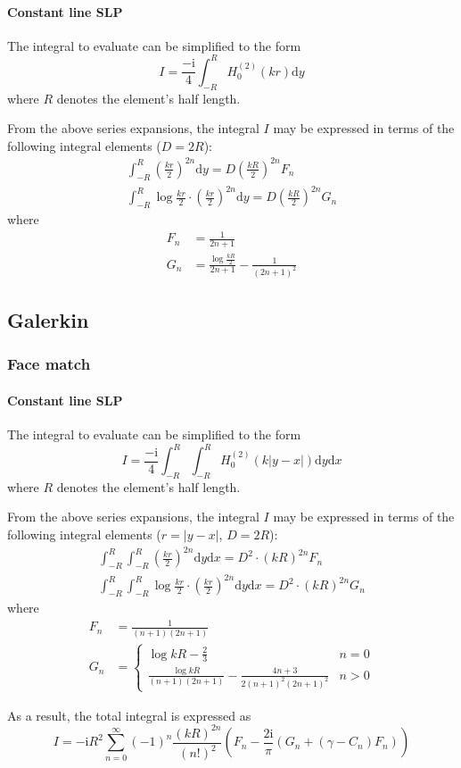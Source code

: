 \documentclass[a4paper,11pt]{article}
\newcommand{\td}{\mathrm{d}}
\newcommand{\ti}{\mathrm{i}}
\begin{document}
\paragraph{Constant line SLP}

The integral to evaluate can be simplified to the form
%
\begin{equation}
I = \frac{-\ti}{4} \int_{-R}^R  H_0^{(2)}(kr)  \td y
\end{equation}
%
where $R$ denotes the element's half length.

From the above series expansions, the integral $I$ may be expressed in terms of the following integral elements ($D = 2R$):
%
\begin{align}
\int_{-R}^R
\left(\frac{kr}{2}\right)^{2n} \td y
= D \left( \frac{kR}{2} \right)^{2n} F_n \\
\int_{-R}^R
\log \frac{kr}{2} \cdot \left(\frac{kr}{2}\right)^{2n} \td y
= D \left(\frac{kR}{2}\right)^{2 n} G_n
\end{align}
%
where
%
\begin{align}
F_n &= \frac{1}{2n+1} \\
G_n &= \frac{\log\frac{kR}{2}} {2 n + 1} - \frac{1}{(2 n + 1)^2}
\end{align}


\subsection{Galerkin}

\subsubsection{Face match}

\paragraph{Constant line SLP}

The integral to evaluate can be simplified to the form
%
\begin{equation}
I = \frac{-\ti}{4} \int_{-R}^{R} \int_{-R}^R  H_0^{(2)}(k|y-x|)  \td y \td x
\end{equation}
%
where $R$ denotes the element's half length.

From the above series expansions, the integral $I$ may be expressed in terms of the following integral elements ($r=|y-x|$, $D = 2R$):
%
\begin{align}
\int_{-R}^{R} \int_{-R}^R  \left(\frac{kr}{2}\right)^{2n}  \td y \td x
= D^2 \cdot (kR)^{2n} F_n
\\
\int_{-R}^{R} \int_{-R}^R  \log \frac{kr}{2} \cdot \left(\frac{kr}{2}\right)^{2n}  \td y \td x
= D^2 \cdot (kR)^{2n} G_n
\end{align}
%
where
%
\begin{align}
F_n &= \frac{1}{(n+1)(2n+1)}
\\
G_n &= \begin{cases}
\log kR - \frac{2}{3} & n = 0 \\
\frac{\log kR}{(n+1)(2n+1)} - \frac{4n+3}{2(n+1)^2(2n+1)^2}& n > 0
\end{cases}
\end{align}

As a result, the total integral is expressed as
%
\begin{equation}
I = -\ti R^2
\sum_{n=0}^{\infty} (-1)^n \frac{(kR)^{2n}}{\left(n!\right)^2}
\left(
F_n
- \frac{2 \ti}{\pi}
\left(G_n + \left(\gamma - C_n \right) F_n \right)
\right)
\end{equation}
\end{document}

